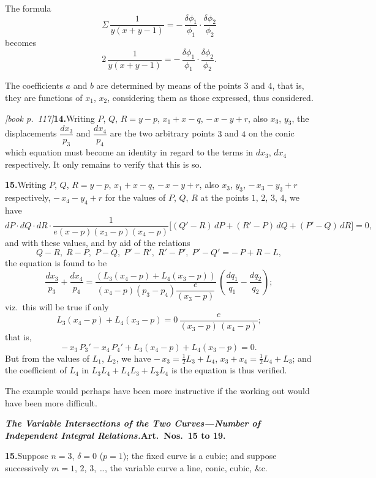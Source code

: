 \documentclass[11pt,a4paper]{article}
\theoremstyle{plain}
\theoremstyle{definition}
\theoremstyle{remark}
\begin{document}
The formula
\[
\Sigma\,\frac{1}{y(x + y - 1)} = -\,\frac{\delta\phi_1}{\phi_1}\cdot\frac{\delta\phi_2}{\phi_2}
\]
becomes
\[
2\,\frac{1}{y(x + y - 1)} = -\,\frac{\delta\phi_1}{\phi_1}\cdot\frac{\delta\phi_2}{\phi_2}.
\]

The coefficients $a$ and $b$ are determined by means of the points $3$ and $4$, that is, they are functions of $x_1$, $x_2$, considering them as those expressed, thus considered.

\noindent\textit{[book p.~117]}\quad \textbf{14.}\quad Writing $P$, $Q$, $R = y - p$, $x_1 + x - q$, $-\,x - y + r$, also $x_3$, $y_3$, the displacements $\dfrac{dx_3}{p_3}$ and $\dfrac{dx_4}{p_4}$ are the two arbitrary points $3$ and $4$ on the conic which equation must become an identity in regard to the terms in $dx_3$, $dx_4$ respectively. It only remains to verify that this is so.

\medskip\noindent\textbf{15.}\quad Writing $P$, $Q$, $R = y - p$, $x_1 + x - q$, $-\,x - y + r$, also $x_3$, $y_3$, $-\,x_3 - y_3 + r$ respectively, $-\,x_4 - y_4 + r$ for the values of $P$, $Q$, $R$ at the points $1$, $2$, $3$, $4$, we have
\[
dP\cdot dQ\cdot dR\cdot \frac{1}{e(x - p)(x_3 - p)(x_4 - p)}\bigl[(Q' - R)\,dP + (R' - P)\,dQ + (P' - Q)\,dR\bigr] = 0,
\]
and with these values, and by aid of the relations
\[
Q - R,\;R - P,\;P - Q,\;P' - R',\;R' - P',\;P' - Q' = -\,P + R - L,
\]
the equation is found to be
\[
\frac{dx_3}{p_3} + \frac{dx_4}{p_4} = \frac{(L_3(x_4 - p) + L_4(x_3 - p))}{(x_4 - p)(p_3 - p_4)\dfrac{e}{(x_3 - p)}}\,\left(\frac{dq_1}{q_1} - \frac{dq_2}{q_2}\right);
\]
viz.\ this will be true if only
\[
L_3(x_4 - p) + L_4(x_3 - p) = 0\,\dfrac{e}{(x_3 - p)\,(x_4 - p)};
\]
that is,
\[
-\,x_3\,P_3' - x_4\,P_4' + L_3(x_4 - p) + L_4(x_3 - p) = 0.
\]
But from the values of $L_1$, $L_2$, we have $-\,x_3 = \tfrac{1}{2}L_3 + L_4$, $x_3 + x_4 = \tfrac{1}{2}L_4 + L_3$; and the coefficient of $L_4$ in $L_3L_4 + L_4L_3 + L_3L_4$ is the equation is thus verified.

The example would perhaps have been more instructive if the working out would have been more difficult.

\medskip\noindent\textbf{\textit{The Variable Intersections of the Two Curves---Number of Independent Integral Relations.}\quad Art.\ Nos.\ 15 to 19.}

\medskip\noindent\textbf{15.}\quad Suppose $n = 3$, $\delta = 0$ ($p = 1$); the fixed curve is a cubic; and suppose successively $m = 1$, $2$, $3$, \ldots, the variable curve a line, conic, cubic, \&c.
\end{document}
